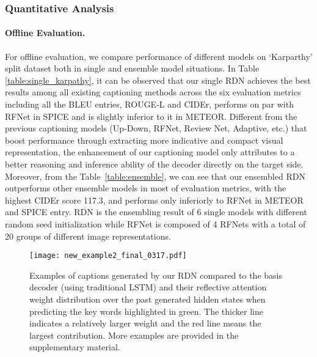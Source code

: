 \documentclass[10pt,twocolumn,letterpaper]{article}
\begin{document}
\vspace{-0.1in}
\subsubsection{Quantitative Analysis}
\label{sec:quantitative_analysis}
\paragraph{Offline Evaluation.}
For offline evaluation, we compare performance of different models on `Karparthy' split dataset both in single and ensemble model situations. 
In Table \ref{table:single_karpathy}, it can be observed that our single RDN achieves the best results among all existing captioning methods across the six evaluation metrics including all the BLEU entries, ROUGE-L and CIDEr, performs on par with RFNet in SPICE and is slightly inferior to it in METEOR.
Different from the previous  captioning models (Up-Down, RFNet, Review Net, Adaptive, etc.) that boost performance through extracting more indicative and compact visual representation, the enhancement of our captioning model only attributes to a better reasoning and inference ability of the decoder directly on the target side.
Moreover, from the Table~\ref{table:ensemble}, we can see that our ensembled RDN outperforms other ensemble models in most of evaluation metrics, with the highest CIDEr score 117.3, and performs only inferiorly to RFNet in METEOR and SPICE entry.
RDN is the ensembling result of 6 single models with different random seed initialization while RFNet is composed of 4 RFNets with a total of 20 groups of different image representations.



\begin{figure*}[!t]
	\centering
	\texttt{[image: new\_example2\_final\_0317.pdf]}
	\caption{Examples of captions generated by our RDN compared to the basis decoder (using traditional LSTM) and their reflective attention weight distribution over the past generated hidden states when predicting the key words highlighted in green. The thicker line indicates a relatively larger weight and the red line means the largest contribution. More examples are provided in the supplementary material.}
	\label{fig:example2}
	\vspace{-0.2in}
\end{figure*}
\end{document}
